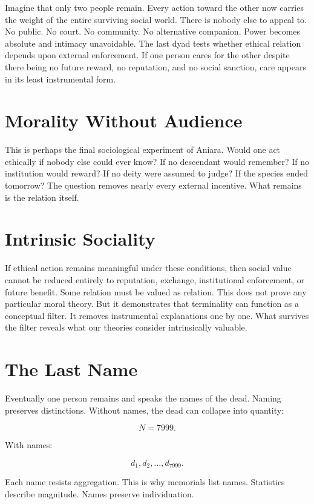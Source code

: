 \documentclass[11pt,oneside]{book}
\theoremstyle{definition}
\theoremstyle{remark}
\begin{document}
Imagine that only two people remain. Every action toward the other now carries the weight of the
entire surviving social world. There is nobody else to appeal to. No public. No court. No community.
No alternative companion. Power becomes absolute and intimacy unavoidable. The last dyad tests
whether ethical relation depends upon external enforcement. If one person cares for the other
despite there being no future reward, no reputation, and no social sanction, care appears in its
least instrumental form.

\section{Morality Without Audience}

This is perhaps the final sociological experiment of Aniara. Would one act ethically if nobody else
could ever know? If no descendant would remember? If no institution would reward? If no deity were
assumed to judge? If the species ended tomorrow? The question removes nearly every external
incentive. What remains is the relation itself.

\section{Intrinsic Sociality}

If ethical action remains meaningful under these conditions, then social value cannot be reduced
entirely to reputation, exchange, institutional enforcement, or future benefit. Some relation must
be valued as relation. This does not prove any particular moral theory. But it demonstrates that
terminality can function as a conceptual filter. It removes instrumental explanations one by one.
What survives the filter reveals what our theories consider intrinsically valuable.

\section{The Last Name}

Eventually one person remains and speaks the names of the dead. Naming preserves distinctions.
Without names, the dead can collapse into quantity:

\[
N=7999.
\]

With names:

\[
d_1,d_2,\ldots,d_{7999}.
\]

Each name resists aggregation. This is why memorials list names. Statistics describe magnitude.
Names preserve individuation.
\end{document}
